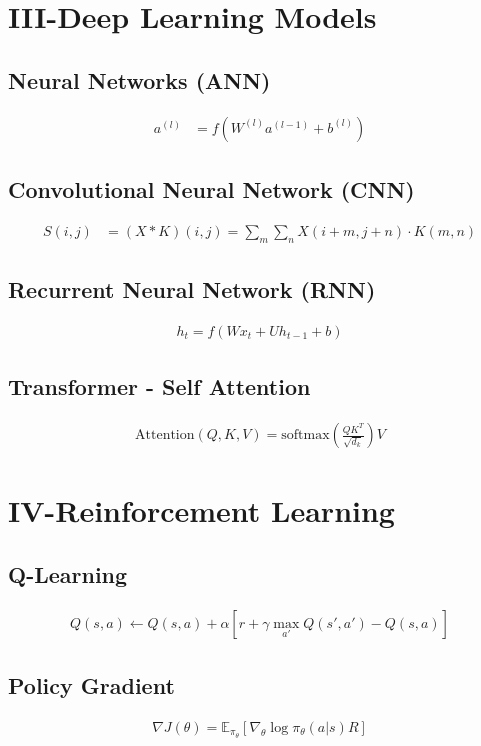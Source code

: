 \documentclass[a4paper,10pt]{article}
\begin{document}
\section*{III-Deep Learning Models}

\subsection*{Neural Networks (ANN)}
\begin{align*}
a^{(l)} &= f(W^{(l)} a^{(l-1)} + b^{(l)})
\end{align*}

\subsection*{Convolutional Neural Network (CNN)}
\begin{align*}
S(i, j) &= (X * K)(i, j) = \sum_m \sum_n X(i+m, j+n) \cdot K(m,n)
\end{align*}

\subsection*{Recurrent Neural Network (RNN)}
\begin{align*}
h_t = f(W x_t + U h_{t-1} + b)
\end{align*}

\subsection*{Transformer - Self Attention}
\begin{align*}
\text{Attention}(Q, K, V) = \text{softmax}\left(\frac{QK^T}{\sqrt{d_k}}\right)V
\end{align*}

\section*{IV-Reinforcement Learning}

\subsection*{Q-Learning}
\begin{align*}
Q(s, a) \leftarrow Q(s, a) + \alpha \left[ r + \gamma \max_{a'} Q(s', a') - Q(s, a) \right]
\end{align*}

\subsection*{Policy Gradient}
\begin{align*}
\nabla J(\theta) = \mathbb{E}_{\pi_\theta} \left[ \nabla_\theta \log \pi_\theta(a|s) R \right]
\end{align*}
\end{document}

